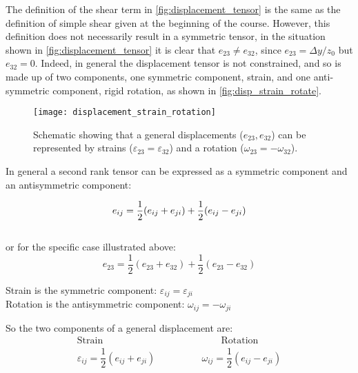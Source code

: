 The definition of the shear term in \autoref{fig:displacement_tensor} is the same as the definition of simple shear given at the beginning of the course. However, this definition does not necessarily result in a symmetric tensor, in the situation shown in \autoref{fig:displacement_tensor} it is clear that $e_{23}\neq e_{32}$, since $e_{23}= \Delta y / z_0$ but $e_{32}=0$. Indeed, in general the displacement tensor is not constrained, and so is made up of two components, one symmetric component, strain, and one anti-symmetric component, rigid rotation, as shown in \autoref{fig:disp_strain_rotate}.


\FloatBarrier

\begin{figure}[h!]
\centering
\texttt{[image: displacement\_strain\_rotation]}
\caption{Schematic showing that a general displacements ($e_{23},e_{32}$) can be represented by  strains ($\varepsilon_{23} = \varepsilon_{32}$) and a rotation ($\omega_{23}=-\omega_{32}$).\label{fig:disp_strain_rotate}}
\end{figure}

\FloatBarrier

In general a second rank tensor can be expressed as a symmetric component and an antisymmetric component:\\
\begin{annotation}
\begin{equation}
e_{ij} = \dfrac{1}{2}(e_{ij} + e_{ji}) + \dfrac{1}{2}(e_{ij} - e_{ji}) \\
\end{equation}
\\
or for the specific case illustrated above:
\begin{equation}
e_{23} = \dfrac{1}{2}(e_{23} + e_{32}) + \dfrac{1}{2}(e_{23} - e_{32})
\end{equation}


Strain is the symmetric component: $\varepsilon_{ij}=\varepsilon_{ji}$\\
Rotation is the antisymmetric component: $\omega_{ij} = - \omega_{ji}$
\end{annotation}



 So the two components of a general displacement are:
\begin{align}
\text{Strain} \qquad \qquad & \qquad \qquad \text{Rotation} \nonumber \\
\varepsilon_{ij} = \dfrac{1}{2}(e_{ij} + e_{ji}) \qquad & \qquad \omega_{ij} = \dfrac{1}{2}(e_{ij} - e_{ji})
\end{align}

